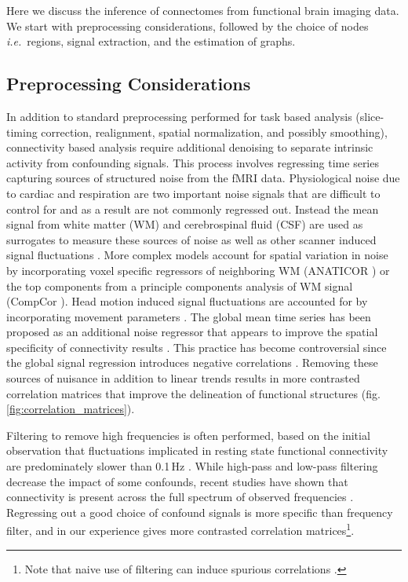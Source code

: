 \documentclass[5p]{elsarticle}
\begin{document}
Here we discuss the inference of connectomes from functional brain
imaging data. We start with preprocessing considerations, followed by
the choice of nodes \emph{i.e.}\ regions,
signal extraction, and the estimation of graphs.  

\subsection{Preprocessing Considerations}

In addition to standard preprocessing performed for task based analysis
(slice-timing correction, realignment, spatial normalization, and possibly
smoothing), connectivity based analysis require additional denoising 
to separate intrinsic activity from confounding signals. This process involves
regressing time series capturing sources of structured noise from the fMRI data.
Physiological noise due to cardiac and respiration are two important
noise signals \cite{hu1995, lund2006, birn2006, birn2008} that are
difficult to control for and as a result are not commonly regressed out. Instead
the mean signal from white matter (WM) and cerebrospinal fluid (CSF) are used as
surrogates to measure these sources of noise as well as other scanner induced
signal fluctuations \cite{fox2005, lund2006}. More complex models account for
spatial variation in noise by incorporating voxel specific regressors of
neighboring WM (ANATICOR \cite{jo2010}) or the top components from a principle
components analysis of WM signal (CompCor \cite{behzadi2007}). Head motion
induced signal fluctuations are accounted for by incorporating movement
parameters \cite{friston1996, fox2005, lund2006}. The global mean time series
has been proposed as an additional noise regressor that appears to improve the
spatial specificity of connectivity results \cite{fox2005, fox2009}. This practice
has become controversial since the global signal regression introduces negative correlations
\cite{murphy2009,chang2009,saad2012}. 
Removing these sources of
nuisance in addition to linear trends results in more contrasted
correlation matrices that improve the delineation of functional structures
(fig.\,\ref{fig:correlation_matrices}). 

Filtering to remove high frequencies is often performed, based on the initial
observation that fluctuations implicated in resting state functional
connectivity are predominately slower than 0.1\,Hz \cite{cordes2001,biswal1995}.
While high-pass and low-pass filtering decrease the impact of some confounds,
recent studies have shown that connectivity is present across the
full spectrum of observed frequencies \cite{smith2012,vanoort2012}. Regressing
out a good choice of confound signals is more specific than frequency filter,
and in our experience gives more contrasted correlation matrices\footnote{Note
	that naive use of filtering can induce spurious correlations
	\cite{davey2012}.}.
\end{document}
